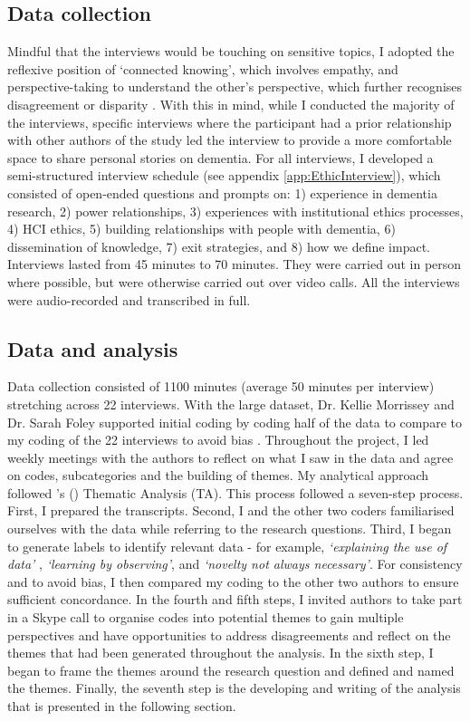 \subsection{Data collection}
\label{Ethics:dataCollection}
Mindful that the interviews would be touching on sensitive topics, I adopted the reflexive position of `connected knowing', which involves empathy, and perspective-taking to understand the other's perspective, which further recognises disagreement or disparity \citep{belenky_womens_1986}. With this in mind, while I conducted the majority of the interviews, specific interviews where the participant had a prior relationship with other authors of the study led the interview to provide a more comfortable space to share personal stories on dementia. For all interviews, I developed a semi-structured interview schedule (see appendix \ref{app:EthicInterview}), which consisted of open-ended questions and prompts on: 1) experience in dementia research, 2) power relationships, 3) experiences with institutional ethics processes, 4) HCI ethics, 5) building relationships with people with dementia, 6) dissemination of knowledge, 7) exit strategies, and 8) how we define impact. Interviews lasted from 45 minutes to 70 minutes. They were carried out in person where possible, but were otherwise carried out over video calls. All the interviews were audio-recorded and transcribed in full.

\subsection{Data and analysis}
\label{Ethics:Analysis}
Data collection consisted of 1100 minutes (average 50 minutes per interview) stretching across 22 interviews. With the large dataset, Dr. Kellie Morrissey and Dr. Sarah Foley supported initial coding by coding half of the data to compare to my coding of the 22 interviews to avoid bias \citep{berends_using_2005}. Throughout the project, I led weekly meetings with the authors to reflect on what I saw in the data and agree on codes, subcategories and the building of themes. My analytical approach followed \citeauthor{braun_using_2006}'s (\citeyear{braun_using_2006,braun_one_2020}) Thematic Analysis (TA). This process followed a seven-step process. First, I prepared the transcripts. Second, I and the other two coders familiarised ourselves with the data while referring to the research questions. Third, I began to generate labels to identify relevant data - for example, \textit{`explaining the use of data'}
, \textit{`learning by observing'}, and \textit{`novelty not always necessary'}. For consistency and to avoid bias, I then compared my coding to the other two authors to ensure sufficient concordance. In the fourth and fifth steps, I invited authors to take part in a Skype call to organise codes into potential themes to gain multiple perspectives and have opportunities to address disagreements and reflect on the themes that had been generated throughout the analysis. In the sixth step, I began to frame the themes around the research question and defined and named the themes. Finally, the seventh step is the developing and writing of the analysis that is presented in the following section.

